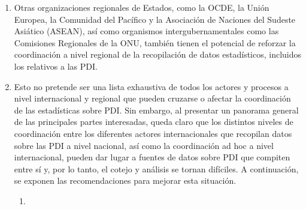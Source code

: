 \documentclass[
]{book}
\begin{document}
\begin{enumerate}
\item
  Otras organizaciones regionales de Estados, como la OCDE, la Unión Europea, la Comunidad del Pacífico y la Asociación de Naciones del Sudeste Asiático (ASEAN), así como organismos intergubernamentales como las Comisiones Regionales de la ONU, también tienen el potencial de reforzar la coordinación a nivel regional de la recopilación de datos estadísticos, incluidos los relativos a las PDI.
\item
  Esto no pretende ser una lista exhaustiva de todos los actores y procesos a nivel internacional y regional que pueden cruzarse o afectar la coordinación de las estadísticas sobre PDI. Sin embargo, al presentar un panorama general de las principales partes interesadas, queda claro que los distintos niveles de coordinación entre los diferentes actores internacionales que recopilan datos sobre las PDI a nivel nacional, así como la coordinación ad hoc a nivel internacional, pueden dar lugar a fuentes de datos sobre PDI que compiten entre sí y, por lo tanto, el cotejo y análisis se tornan difíciles. A continuación, se exponen las recomendaciones para mejorar esta situación.

  \begin{enumerate}
  \def\labelenumii{\arabic{enumii}.}
  \item ~
    \hypertarget{principios-relevantes-para-la-elaboraciuxf3n-de-estaduxedsticas-internacionales}{%
}
\end{enumerate}
\end{enumerate}
\end{document}
